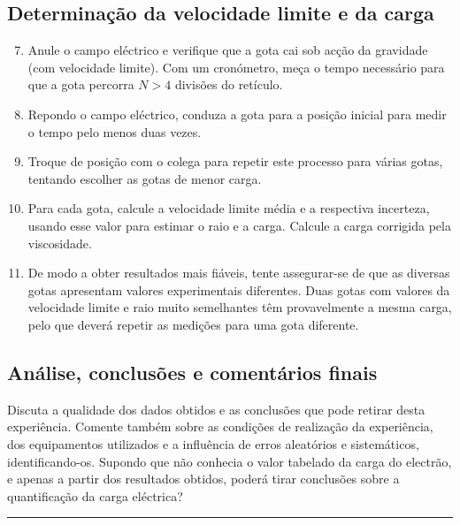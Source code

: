 \documentclass[a4paper,twoside,11pt]{report}      %
\newcommand{\HRule}{\rule{\linewidth}{0.5mm}}
\begin{document}
 \subsection{\sf Determinação da velocidade limite e da carga}
 \begin{enumerate}
 \setcounter{enumi}{6}

\item Anule o campo eléctrico  e verifique que a gota cai sob acção da gravidade (com velocidade limite). 
Com um cronómetro, meça o tempo necessário para que a gota percorra  $N>4$ divisões
do retículo. 
\item Repondo o campo eléctrico, conduza a gota para a posição inicial para  medir o tempo pelo menos duas vezes. 

\item Troque de posição com o colega para repetir este processo para várias gotas, tentando escolher as gotas de menor carga.

\item   Para cada gota, calcule a velocidade limite média e a respectiva incerteza, usando esse valor para estimar o raio e 
a carga. Calcule a carga corrigida pela viscosidade.

\item De modo a obter resultados mais fiáveis, tente assegurar-se de que as diversas gotas apresentam valores experimentais diferentes. Duas gotas com valores da velocidade limite e raio muito semelhantes têm provavelmente a mesma carga, pelo que deverá repetir as medições para uma gota diferente.
\end{enumerate}

\subsection{\sf Análise, conclusões e comentários finais}
Discuta a qualidade dos dados obtidos e as conclusões que pode retirar desta experiência. Comente também sobre as condições de realização da experiência, dos equipamentos utilizados e a influência de erros aleatórios e sistemáticos, identificando-os. Supondo que não conhecia o valor tabelado da carga do electrão, e apenas a partir dos resultados obtidos, poderá tirar conclusões sobre a quantificação da carga eléctrica?\\
\HRule \\[0.5cm]



\end{document}
